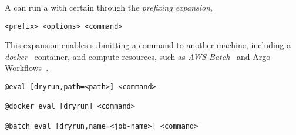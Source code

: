 A  can run a  with certain  through the \emph{prefixing expansion},
%
\begin{verbatim}
<prefix> <options> <command>
\end{verbatim}
%
This expansion enables submitting a command to another machine, including a \emph{docker}~\cite{docker} container, and compute resources, such as \emph{AWS Batch}~\cite{aws_batch} and Argo Workflows~\cite{argoflow}.
%
\begin{verbatim}
@eval [dryrun,path=<path>] <command>

@docker eval [dryrun] <command>

@batch eval [dryrun,name=<job-name>] <command>
\end{verbatim}